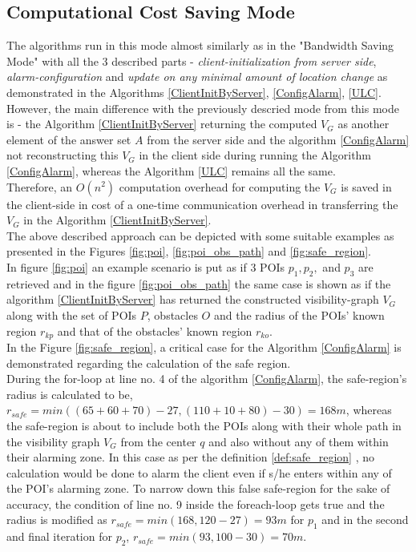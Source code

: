 \documentclass{sig-alternate}
\begin{document}
\subsection{Computational Cost Saving Mode}
The algorithms run in this mode almost similarly as in the "Bandwidth Saving Mode" with all the 3 described parts - \textit{client-initialization from server side}, \textit{alarm-configuration} and \textit{update on any minimal amount of location change} as demonstrated in the Algorithms \ref{ClientInitByServer}, \ref{ConfigAlarm}, \ref{ULC}. \\
However, the main difference with the previously descried mode from this mode is - the Algorithm \ref{ClientInitByServer} returning the computed $V_G$ as another element of the answer set $A$ from the server side and the algorithm \ref{ConfigAlarm} not reconstructing this $V_G$ in the client side during running the Algorithm \ref{ConfigAlarm}, whereas the Algorithm \ref{ULC} remains all the same. \\
Therefore, an $O(n^2)$ computation overhead for computing the $V_G$ is saved in the client-side in cost of a one-time communication overhead in transferring the $V_G$ in the Algorithm \ref{ClientInitByServer}.\\

The above described approach can be depicted with some suitable examples as presented in the Figures \ref{fig:poi}, \ref{fig:poi_obs_path} and \ref{fig:safe_region}.\\

In figure \ref{fig:poi} an example scenario is put as if 3 POIs $p_1, p_2,$ and $p_3$ are retrieved and in the figure \ref{fig:poi_obs_path} the same case is shown as if the algorithm \ref{ClientInitByServer} has returned the constructed visibility-graph $V_G$ along with the set of POIs $P$, obstacles $O$ and the radius of the POIs' known region $r_{kp}$ and that of the obstacles' known region $r_{ko}$.\\

In the Figure \ref{fig:safe_region}, a critical case for the Algorithm \ref{ConfigAlarm} is demonstrated regarding the calculation of the safe region.
\\During the for-loop at line no. 4 of the algorithm \ref{ConfigAlarm}, the safe-region's radius is calculated to be,
\\$r_{safe} = min( (65+60+70)-27, (110+10+80)-30 ) = 168m$, whereas the safe-region is about to include both the POIs along with their whole path in the visibility graph $V_G$ from the center $q$ and also without any of them within their alarming zone. In this case as per the definition \ref{def:safe_region} , no calculation would be done to alarm the client even if s/he enters within any of the POI's alarming zone. To narrow down this false safe-region for the sake of accuracy, the condition of line no. 9 inside the foreach-loop gets true and the radius is modified as $r_{safe} = min(168, 120-27) = 93m$ for $p_1$ and in the second and final iteration for $p_2$, $r_{safe} = min( 93, 100-30) = 70m$.
\end{document}

